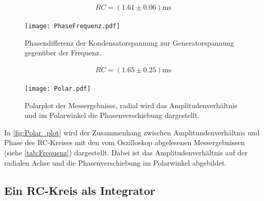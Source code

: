 \begin{align*}
  RC=(1.61 ± 0.06)\si{\milli\second}
\end{align*}

\begin{figure}[H]
  \centering
  \texttt{[image: PhaseFrequenz.pdf]}
  \caption{Phasendifferenz der Kondensatorspannung zur Generatorspannung gegenüber der Frequenz.}
  \label{fig:PhaseFrequenz_plot}
\end{figure}
\begin{align*}
  RC=(1.65 ± 0.25)\si{\milli\second}
\end{align*}


\begin{figure}[H]
  \centering
  \texttt{[image: Polar.pdf]}
  \caption{Polarplot der Messergebnisse, radial wird das Amplitudenverhältnis und im Polarwinkel die Phasenverschiebung dargestellt.}
  \label{fig:Polar_plot}
\end{figure}
In \autoref{fig:Polar_plot} wird der Zusammenhang zwischen Amplitundenverhältnis und Phase des RC-Kreises mit den vom Oszilloskop abgelesenen Messergebnissen (siehe \autoref{tab:Frequenz}) dargestellt.
Dabei ist das Amplitudenverhältnis auf der radialen Achse und die Phasenverschiebung im Polarwinkel abgebildet.

\subsection{Ein RC-Kreis als Integrator} %
\label{sub:Integrator}

